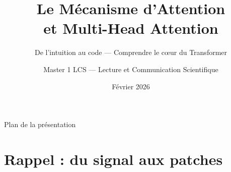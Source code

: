 \documentclass[aspectratio=169, 11pt]{beamer}
\title[Attention \& Multi-Head]{Le Mécanisme d'Attention\\et Multi-Head Attention}
\subtitle{De l'intuition au code --- Comprendre le cœur du Transformer}
\author{Master 1 LCS --- Lecture et Communication Scientifique}
\institute{D'après \emph{An Introduction to Transformers} (Turner, 2024)}
\date{Février 2026}
\begin{document}
\begin{frame}
\titlepage
\end{frame}

\begin{frame}{Plan de la présentation}
\tableofcontents
\end{frame}

\section{Rappel : du signal aux patches}
\end{document}
